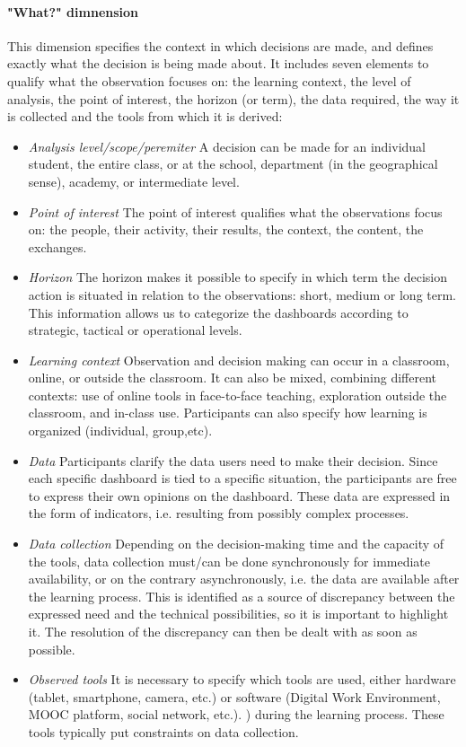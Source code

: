 \documentclass[manuscript,screen,nonacm,12pt]{acmart}
\begin{document}
\paragraph{"What?" dimnension}
This dimension specifies the context in which decisions are made, and defines exactly what the decision is being made about. It includes seven elements to qualify what the observation focuses on: the learning context, the level of analysis, the point of interest, the horizon (or term), the data required, the way it is collected and the tools from which it is derived:
\begin{itemize}
    \item \textit{Analysis level/scope/peremiter} A decision can be made for an individual student, the entire class, or at the school, department (in the geographical sense), academy, or intermediate level.
    \item \textit{Point of interest} The point of interest qualifies what the observations focus on: the people, their activity, their results, the context, the content, the exchanges.
    \item \textit{Horizon}  The horizon makes it possible to specify in which term the decision action is situated in relation to the observations: short, medium or long term. This information allows us to categorize the dashboards according to strategic, tactical or operational levels.
    \item \textit{Learning context} Observation and decision making can occur in a classroom, online, or outside the classroom. It can also be mixed, combining different contexts: use of online tools in face-to-face teaching, exploration outside the classroom, and in-class use. Participants can also specify how learning is organized (individual, group,etc).
    \item \textit{Data}  Participants clarify the data users need to make their decision. Since each specific dashboard is tied to a specific situation, the participants are free to express their own opinions on the dashboard. These data are expressed in the form of indicators, i.e. resulting from possibly complex processes.
    \item \textit{Data collection} Depending on the decision-making time and the capacity of the tools, data collection must/can be done synchronously for immediate availability, or on the contrary asynchronously, i.e. the data are available after the learning process. This is identified as a source of discrepancy between the expressed need and the technical possibilities, so it is important to highlight it. The resolution of the discrepancy can then be dealt with as soon as possible.
    \item \textit{Observed tools} It is necessary to specify which tools are used, either hardware (tablet, smartphone, camera, etc.) or software (Digital Work Environment, MOOC platform, social network, etc.). ) during the learning process. These tools typically put constraints on data collection. 
\end{itemize}
\end{document}
